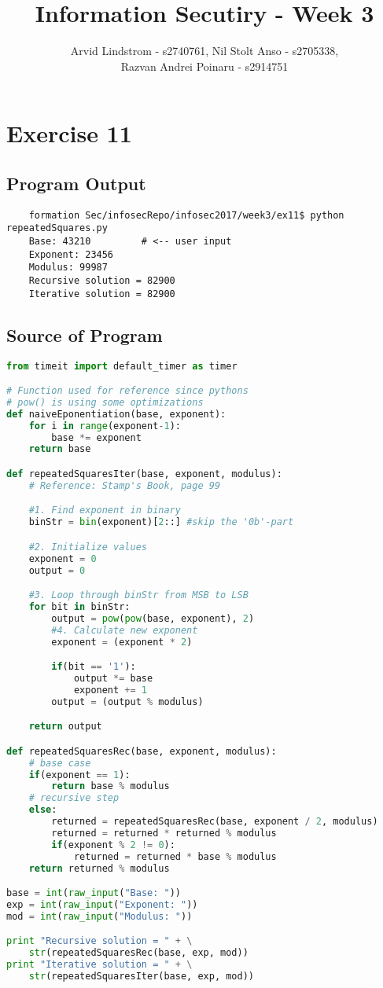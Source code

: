 \documentclass[a4paper]{article}
\title{Information Secutiry - Week 3}
\author{Arvid Lindstrom - s2740761, Nil Stolt Anso - s2705338,\\ Razvan Andrei Poinaru - s2914751}
\begin{document}
\maketitle

\section*{Exercise 11}

\subsection*{Program Output}

\begin{verbatim}
	formation Sec/infosecRepo/infosec2017/week3/ex11$ python repeatedSquares.py
	Base: 43210			# <-- user input
	Exponent: 23456
	Modulus: 99987
	Recursive solution = 82900
	Iterative solution = 82900
\end{verbatim}

\subsection*{Source of Program}

\begin{lstlisting}[language=Python]
from timeit import default_timer as timer

# Function used for reference since pythons
# pow() is using some optimizations
def naiveEponentiation(base, exponent):
	for i in range(exponent-1):
		base *= exponent
	return base

def repeatedSquaresIter(base, exponent, modulus):
	# Reference: Stamp's Book, page 99

	#1. Find exponent in binary
	binStr = bin(exponent)[2::] #skip the '0b'-part

	#2. Initialize values
	exponent = 0
	output = 0

	#3. Loop through binStr from MSB to LSB
	for bit in binStr:
		output = pow(pow(base, exponent), 2)
		#4. Calculate new exponent
		exponent = (exponent * 2)

		if(bit == '1'):
			output *= base
			exponent += 1
		output = (output % modulus)

	return output

def repeatedSquaresRec(base, exponent, modulus):
	# base case
	if(exponent == 1):
		return base % modulus
	# recursive step
	else:
		returned = repeatedSquaresRec(base, exponent / 2, modulus)
		returned = returned * returned % modulus
		if(exponent % 2 != 0):
			returned = returned * base % modulus
	return returned % modulus

base = int(raw_input("Base: "))
exp = int(raw_input("Exponent: "))
mod = int(raw_input("Modulus: "))

print "Recursive solution = " + \
	str(repeatedSquaresRec(base, exp, mod))
print "Iterative solution = " + \
	str(repeatedSquaresIter(base, exp, mod))
\end{lstlisting}
\end{document}
